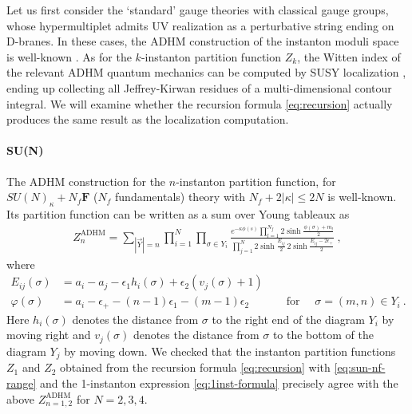 \documentclass[letterpaper, 11pt]{article}
\def\e{\epsilon}
\def\s{\sigma}
\begin{document}
{Let us first consider the `standard' gauge theories with classical gauge groups, whose hypermultiplet admits UV realization as a perturbative string ending on D-branes. In these cases, the ADHM construction of the instanton moduli space is well-known \cite{Atiyah:1978ri,Nekrasov:2002qd,Shadchin:2005mx}. 
As for the $k$-instanton partition function $Z_k$, the Witten index of the relevant ADHM quantum mechanics can be computed by SUSY localization \cite{Kim:2011mv, Hwang:2014uwa,Hwang:2016gfw, Lee:2017lfw}, ending up collecting all Jeffrey-Kirwan residues of a multi-dimensional contour integral. We will examine whether the recursion formula \eqref{eq:recursion} actually produces  the same result as the localization computation.

\paragraph{SU(N)}

The ADHM construction for the $n$-instanton partition function, for $SU(N)_\kappa +N_f \mathbf{F}$ ($N_f$ fundamentals) theory with $N_f + 2|\kappa| \leq 2N$ is well-known. Its partition function can be written as a sum over Young tableaux as
\begin{align}
  \label{eq:SUn-young}
  Z_n^\text{ADHM} = \sum_{|\vec{Y}| = n}\prod_{i=1}^N\prod_{\s \in Y_i}\frac{e^{-\kappa \phi(s)} \prod_{l=1}^{N_f} 2\sinh{\frac{\phi(\s)+m_l}{2}}  }{\prod_{j=1}^N 2\sinh{\frac{E_{ij}}{2}}\,2\sinh{\frac{E_{ij}-2\e_+}{2}}} \ , 
\end{align}
where
\begin{align*}
  E_{ij}(\s) &= a_i - a_j - \e_1 h_i(\s)+ \e_2(v_j(\s)+1)\\
  \varphi(\s)&= a_i  -\e_+-(n-1)\e_1-(m-1)\e_2
   \quad \qquad\text{ for }\quad \s = (m,n) \in Y_i \ . 
\end{align*}
Here $h_i(\s)$ denotes the distance from $\s$ to the right end of the diagram $Y_i$ by moving right and $v_j(\s)$ denotes the distance from $\s$ to the bottom of the diagram $Y_j$ by moving down.
We checked that the instanton partition functions $Z_1$ and $Z_2$ obtained from the recursion formula \eqref{eq:recursion} with \eqref{eq:sun-nf-range} and the 1-instanton expression \eqref{eq:1inst-formula} precisely agree with the above  $Z_{n=1,2}^\text{ADHM}$ for $N=2,3,4$. 

}
\end{document}
